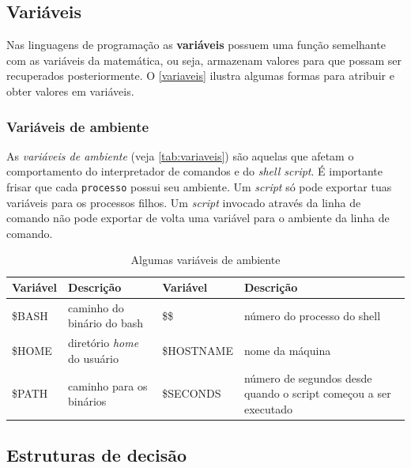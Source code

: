 \documentclass[11pt]{ifscarticle}
\begin{document}
\subsection{Variáveis}

Nas linguagens de programação as \textbf{variáveis} possuem uma função semelhante com as variáveis da matemática, ou seja, armazenam valores para que possam ser recuperados posteriormente. O \autoref{variaveis} ilustra algumas formas para atribuir e obter valores em variáveis.








\subsubsection{Variáveis de ambiente}

As \textit{variáveis de ambiente} (veja \autoref{tab:variaveis}) são aquelas que afetam o comportamento do interpretador de comandos e do \textit{shell script}. É importante frisar que cada \texttt{processo} possui seu ambiente. Um \textit{script} só pode exportar tuas variáveis para os processos filhos. Um \textit{script} invocado através da linha de comando não pode exportar de volta uma variável para o ambiente da linha de comando.

\begin{table}[!htpb]
    \centering
    \caption{Algumas variáveis de ambiente}\label{tab:variaveis}
    \begin{tabular}{lp{5cm}lp{5cm}}\toprule
        \textbf{Variável} & \textbf{Descrição}  & \textbf{Variável} & \textbf{Descrição} \\ \midrule
        \$BASH & caminho do binário do bash & \$\$ & número do processo do shell\\ 
        \$HOME & diretório \textit{home} do usuário & \$HOSTNAME & nome da máquina\\ 
        \$PATH & caminho para os binários & \$SECONDS & número de segundos desde quando o script começou a ser executado\\ \bottomrule
    \end{tabular}
\end{table}

\clearpage
\subsection{Estruturas de decisão}
\end{document}
